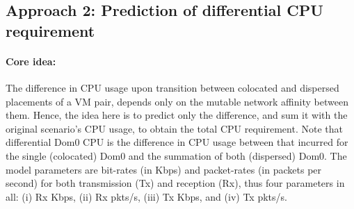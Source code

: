 \subsection{Approach 2: Prediction of differential CPU requirement}
\paragraph{Core idea: }
The difference in CPU usage upon transition between
colocated and dispersed placements of a VM pair, depends only on the mutable
network affinity between them. Hence, the idea here is to predict only
the difference, and sum it with the original scenario's CPU usage, to
obtain the total CPU requirement.
Note that differential Dom0 CPU is the difference in CPU 
usage between that incurred for the single (colocated) Dom0 and
the summation of both (dispersed) Dom0.
The model parameters are bit-rates (in Kbps) and packet-rates (in packets 
per second) for both transmission (Tx) and reception (Rx), thus four parameters
in all: (i) Rx Kbps, (ii) Rx pkts/s, (iii) Tx Kbps, and (iv) Tx pkts/s. 

